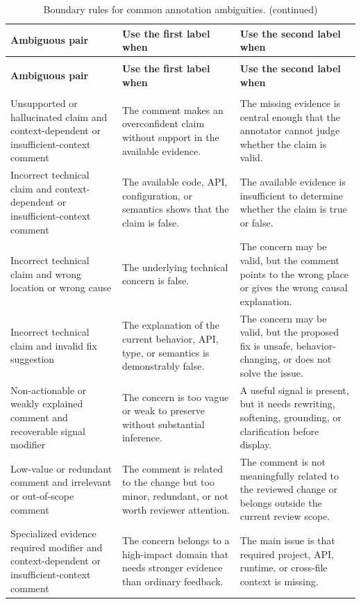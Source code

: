 \documentclass[10pt]{article}
\begin{document}
\begingroup
\footnotesize
\renewcommand{\arraystretch}{1.18}
\begin{longtable}{@{}>{\raggedright\arraybackslash}p{}>{\raggedright\arraybackslash}p{}>{\raggedright\arraybackslash}p{}@{}}
\caption{Boundary rules for common annotation ambiguities.}\label{tab:taxonomy-boundary-rules} \\
\toprule
\rowcolor{ACMTableHead}
\textbf{Ambiguous pair} & \textbf{Use the first label when} & \textbf{Use the second label when} \\
\midrule
\endfirsthead
\caption[]{Boundary rules for common annotation ambiguities. (continued)} \\
\toprule
\rowcolor{ACMTableHead}
\textbf{Ambiguous pair} & \textbf{Use the first label when} & \textbf{Use the second label when} \\
\midrule
\endhead
\midrule
\multicolumn{3}{r}{Continued on next page} \\
\endfoot
\bottomrule
\endlastfoot
Unsupported or hallucinated claim and context-dependent or insufficient-context comment & The comment makes an overconfident claim without support in the available evidence. & The missing evidence is central enough that the annotator cannot judge whether the claim is valid. \\
Incorrect technical claim and context-dependent or insufficient-context comment & The available code, API, configuration, or semantics shows that the claim is false. & The available evidence is insufficient to determine whether the claim is true or false. \\
Incorrect technical claim and wrong location or wrong cause & The underlying technical concern is false. & The concern may be valid, but the comment points to the wrong place or gives the wrong causal explanation. \\
Incorrect technical claim and invalid fix suggestion & The explanation of the current behavior, API, type, or semantics is demonstrably false. & The concern may be valid, but the proposed fix is unsafe, behavior-changing, or does not solve the issue. \\
Non-actionable or weakly explained comment and recoverable signal modifier & The concern is too vague or weak to preserve without substantial inference. & A useful signal is present, but it needs rewriting, softening, grounding, or clarification before display. \\
Low-value or redundant comment and irrelevant or out-of-scope comment & The comment is related to the change but too minor, redundant, or not worth reviewer attention. & The comment is not meaningfully related to the reviewed change or belongs outside the current review scope. \\
Specialized evidence required modifier and context-dependent or insufficient-context comment & The concern belongs to a high-impact domain that needs stronger evidence than ordinary feedback. & The main issue is that required project, API, runtime, or cross-file context is missing. \\
\end{longtable}
\endgroup
\end{document}
